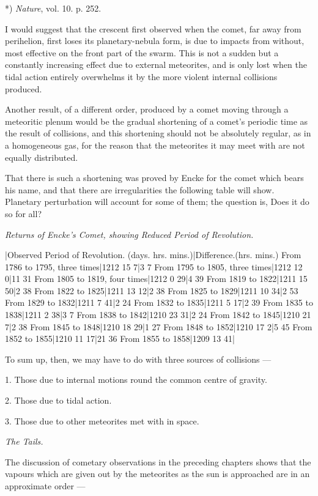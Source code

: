 \documentclass[a4paper, 12pt, oneside, polutonikogreek, english]{article}
\begin{document}
*) \emph{Nature}, vol. 10. p. 252.

I would suggest that the crescent first observed when the comet, far away from perihelion, first loses its planetary-nebula form, is due to impacts from without, most effective on the front part of the swarm. This is not a sudden but a constantly increasing effect due to external meteorites, and is only lost when the tidal action entirely overwhelms it by the more violent internal collisions produced.

Another result, of a different order, produced by a comet moving through a meteoritic plenum would be the gradual shortening of a comet's periodic time as the result of collisions, and this shortening should not be absolutely regular, as in a homogeneous gas, for the reason that the meteorites it may meet with are not equally distributed.

That there is such a shortening was proved by Encke for the comet which bears his name, and that there are irregularities the following table will show. Planetary perturbation will account for some of them; the question is, Does it do so for all?

\emph{Returns of Encke's Comet, showing Reduced Period of Revolution.}

|Observed Period of Revolution. (days. hrs. mins.)|Difference.(hrs. mins.) 
From 1786 to 1795, three times|1212 15 7|3 7 
From 1795 to 1805, three times|1212 12 0|11 31 
From 1805 to 1819, four times|1212 0 29|4 39 
From 1819 to 1822|1211 15 50|2 38 
From 1822 to 1825|1211 13 12|2 38 
From 1825 to 1829|1211 10 34|2 53 
From 1829 to 1832|1211 7 41|2 24 
From 1832 to 1835|1211 5 17|2 39 
From 1835 to 1838|1211 2 38|3 7 
From 1838 to 1842|1210 23 31|2 24 
From 1842 to 1845|1210 21 7|2 38 
From 1845 to 1848|1210 18 29|1 27 
From 1848 to 1852|1210 17 2|5 45 
From 1852 to 1855|1210 11 17|21 36 
From 1855 to 1858|1209 13 41|

To sum up, then, we may have to do with three sources of collisions ---

1. Those due to internal motions round the common centre of gravity.

2. Those due to tidal action.

3. Those due to other meteorites met with in space.

\emph{The Tails.}

The discussion of cometary observations in the preceding chapters shows that the vapours which are given out by the meteorites as the sun is approached are in an approximate order ---
\end{document}
